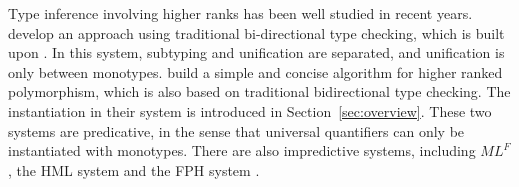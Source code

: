 Type inference involving higher ranks has been well studied in recent years.
\citet{jones2007practical} develop an approach using traditional bi-directional
type checking, which is built upon \citet{odersky1996putting}. In this system,
subtyping and unification are separated, and unification is only between
monotypes. \citet{dunfield2013complete} build a simple and concise algorithm for
higher ranked polymorphism, which is also based on traditional bidirectional
type checking. The instantiation in their system is introduced in
Section~\ref{sec:overview}. These two systems are predicative, in the sense that
universal quantifiers can only be instantiated with monotypes. There are also
impredictive systems, including $ML^F$
\citep{le2014mlf,remy2008graphic,le2009recasting}, the HML system
\citep{leijen2009flexible} and the FPH system \citep{vytiniotis2008fph}.
